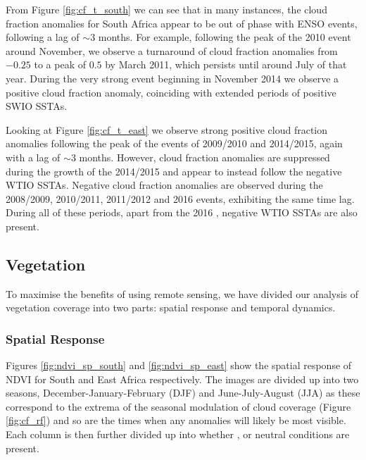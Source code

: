 From Figure \ref{fig:cf_t_south} we can see that in many instances, the
cloud fraction anomalies for South Africa appear to be out of phase
with ENSO events, following a lag of ${\sim}3$ months. For example,
following the peak of the 2010 \nina{} event around November, we
observe a turnaround of cloud fraction anomalies from $-0.25$ to a
peak of $0.5$ by March 2011, which persists until around July of that
year. During the very strong \elnino{} event beginning in November
2014 we observe a positive cloud fraction anomaly, coinciding with
extended periods of positive SWIO SSTAs.

Looking at Figure \ref{fig:cf_t_east} we observe strong positive cloud
fraction anomalies following the peak of the \elnino{} events of
2009/2010 and 2014/2015, again with a lag of ${\sim}3$ months. However,
cloud fraction anomalies are suppressed during the growth of the
2014/2015 \elnino{} and appear to instead follow the negative WTIO
SSTAs. Negative cloud fraction anomalies are observed during the
2008/2009, 2010/2011, 2011/2012 and 2016 \nina{} events, exhibiting
the same time lag. During all of these periods, apart from the 2016
\nina{}, negative WTIO SSTAs are also present.

\subsection{Vegetation}
To maximise the benefits of using remote sensing, we have divided our
analysis of vegetation coverage into two parts: spatial response and
temporal dynamics.

\subsubsection{Spatial Response}
Figures \ref{fig:ndvi_sp_south} and \ref{fig:ndvi_sp_east} show the
spatial response of NDVI for South and East Africa respectively. The
images are divided up into two seasons, December-January-February
(DJF) and June-July-August (JJA) as these correspond to the extrema of
the seasonal modulation of cloud coverage (Figure \ref{fig:cf_rf}) and
so are the times when any anomalies will likely be most visible. Each
column is then further divided up into whether \elnino{}, \nina{} or
neutral conditions are present.

